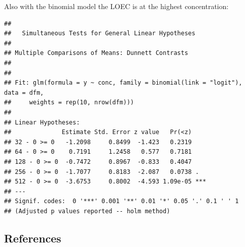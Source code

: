 Also with the binomial model the LOEC is at the highest concentration:
\begin{knitrout}
\color{fgcolor}\begin{kframe}
\begin{alltt}
\hlstd{(}  \hlstd{=} \hlstd{(} \hlstd{=} \hlstd{),}  \hlstd{=} \hlstd{),}
         \hlstd{=} \hlstd{(}\hlstd{))}
\end{alltt}
\begin{verbatim}
## 
## 	 Simultaneous Tests for General Linear Hypotheses
## 
## Multiple Comparisons of Means: Dunnett Contrasts
## 
## 
## Fit: glm(formula = y ~ conc, family = binomial(link = "logit"), data = dfm, 
##     weights = rep(10, nrow(dfm)))
## 
## Linear Hypotheses:
##              Estimate Std. Error z value   Pr(<z)    
## 32 - 0 >= 0   -1.2098     0.8499  -1.423   0.2319    
## 64 - 0 >= 0    0.7191     1.2458   0.577   0.7181    
## 128 - 0 >= 0  -0.7472     0.8967  -0.833   0.4047    
## 256 - 0 >= 0  -1.7077     0.8183  -2.087   0.0738 .  
## 512 - 0 >= 0  -3.6753     0.8002  -4.593 1.09e-05 ***
## ---
## Signif. codes:  0 '***' 0.001 '**' 0.01 '*' 0.05 '.' 0.1 ' ' 1
## (Adjusted p values reported -- holm method)
\end{verbatim}
\end{kframe}
\end{knitrout}



\subsection{References}
\printbibliography[heading=none]

